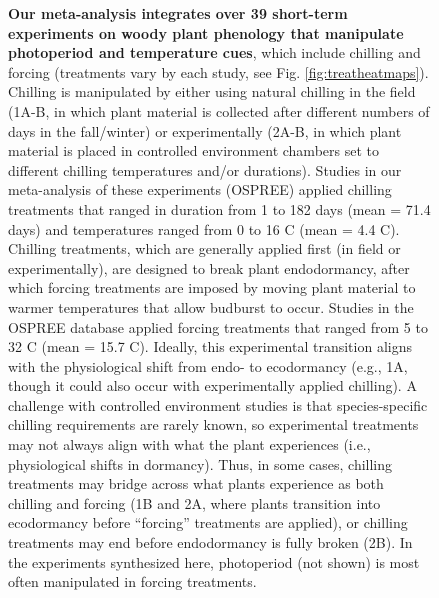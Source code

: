 \documentclass{article}
\newcommand{\R}[1]{\label{#1}\linelabel{#1}}
\begin{document}
\begin{figure}[h!]
\caption{\textbf{Our meta-analysis integrates over 39 \R{ee10}short-term experiments on woody plant phenology that manipulate photoperiod and temperature cues}, which include chilling and forcing (treatments vary by each study, see Fig. \ref{fig:treatheatmaps}). Chilling is manipulated by either using natural chilling in the field (1A-B, in which plant material is collected after different numbers of days in the fall/winter) or experimentally (2A-B, in which plant material is placed in controlled environment chambers set to different chilling temperatures and/or durations). Studies in our meta-analysis of these experiments (OSPREE) applied chilling treatments that ranged in duration from 1 to 182 days (mean = 71.4 days) and temperatures ranged from  0 to 16 \degree C (mean = 4.4 \degree C). Chilling treatments, which are generally applied first (in field or experimentally), are designed to break plant endodormancy, after which forcing treatments are imposed by moving plant material to warmer temperatures that allow budburst to occur. Studies in the OSPREE database applied forcing treatments that ranged from 5 to 32 \degree C (mean = 15.7 \degree C). Ideally, this experimental transition aligns with the physiological shift from endo- to ecodormancy (e.g., 1A, though it could also occur with experimentally applied chilling). A challenge with controlled environment studies is that species-specific chilling requirements are rarely known, so experimental treatments may not always align with what the plant experiences (i.e., physiological shifts in dormancy). Thus, in some cases, chilling treatments may bridge across what plants experience as both chilling and forcing (1B and 2A, where plants transition into ecodormancy before ``forcing'' treatments are applied), or chilling treatments may end before endodormancy is fully broken (2B). In the \R{ee11}experiments synthesized here, photoperiod (not shown) is most often manipulated in forcing treatments.}
\label{fig:concept}  
\end{figure}
\end{document}
